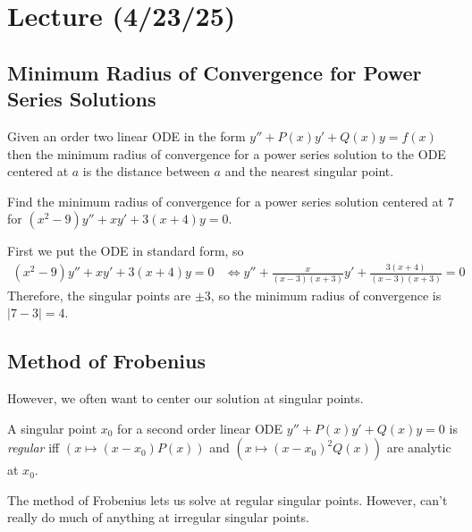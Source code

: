 \documentclass[notes]{subfiles}
\begin{document}
\setcounter{section}{20}
\section{Lecture (4/23/25)}

\subsection{Minimum Radius of Convergence for Power Series Solutions}
\begin{theorem}
    Given an order two linear ODE in the form $y'' + P(x)y' + Q(x)y = f(x)$ then the minimum radius of convergence for a power series solution to the ODE centered at $a$ is the distance between $a$ and the nearest singular point.
\end{theorem}

\begin{exercise}
    Find the minimum radius of convergence for a power series solution centered at $7$ for $(x^2 - 9)y'' + xy' + 3(x + 4)y = 0$.
\end{exercise}
\begin{solution}
    First we put the ODE in standard form, so
    \begin{align*}
        (x^2 - 9)y'' + xy' + 3(x + 4)y = 0
        &\iff y'' + \frac{x}{(x - 3)(x + 3)}y' + \frac{3(x + 4)}{(x - 3)(x + 3)} = 0
    \end{align*}
    Therefore, the singular points are $\pm 3$, so the minimum radius of convergence is $|7 - 3| = 4$.
\end{solution}

\subsection{Method of Frobenius}
However, we often want to center our solution at singular points.

\begin{definition}
    A singular point $x_0$ for a second order linear ODE $y'' + P(x)y' + Q(x)y = 0$ is \textsl{regular} iff $(x \mapsto (x - x_0)P(x))$ and $(x \mapsto (x - x_0)^2 Q(x))$ are analytic at $x_0$.
\end{definition}

The method of Frobenius lets us solve at regular singular points. However, can't really do much of anything at irregular singular points.
\end{document}
